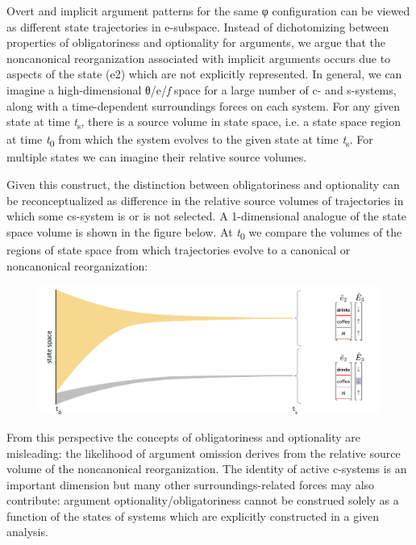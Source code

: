   Overt and implicit argument patterns for the same φ configuration can be viewed as different state trajectories in e-subspace. Instead of dichotomizing between properties of obligatoriness and optionality for arguments, we argue that the noncanonical reorganization associated with implicit arguments occurs due to aspects of the state (e2) which are not explicitly represented. In general, we can imagine a high-dimensional θ/e/\textit{f} space for a large number of c- and s-systems, along with a time-dependent surroundings forces on each system. For any given state at time \textit{t}\textsubscript{s}, there is a source volume in state space, i.e. a state space region at time \textit{t}\textsubscript{0} from which the system evolves to the given state at time \textit{t}\textsubscript{s}. For multiple states we can imagine their relative source volumes. 

  Given this construct, the distinction between obligatoriness and optionality can be reconceptualized as difference in the relative source volumes of trajectories in which some cs-system is or is not selected. A 1-dimensional analogue of the state space volume is shown in the figure below. At \textit{t}\textsubscript{0} we compare the volumes of the regions of state space from which trajectories evolve to a canonical or noncanonical reorganization: 

  
\begin{figure}
\includegraphics[width=\textwidth]{figures/Tilsen-img88.png}
\caption{\missingcaption}
\label{fig:}
\end{figure}
 

  From this perspective the concepts of obligatoriness and optionality are misleading: the likelihood of argument omission derives from the relative source volume of the noncanonical reorganization. The identity of active c-systems is an important dimension but many other surroundings-related forces may also contribute: argument optionality/obligatoriness cannot be construed solely as a function of the states of systems which are explicitly constructed in a given analysis.

